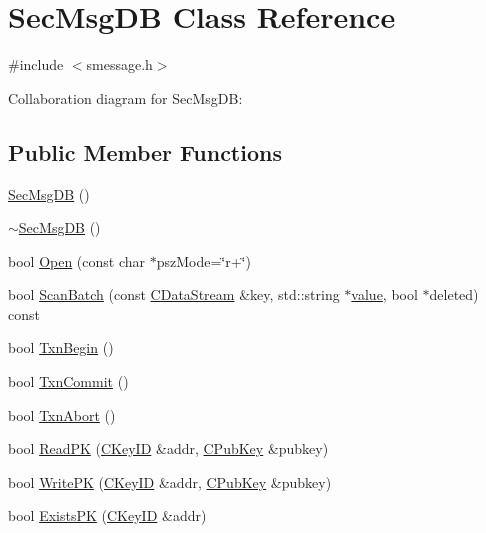 \hypertarget{class_sec_msg_d_b}{}\section{Sec\+Msg\+D\+B Class Reference}
\label{class_sec_msg_d_b}


{\ttfamily \#include $<$smessage.\+h$>$}



Collaboration diagram for Sec\+Msg\+D\+B\+:
\subsection*{Public Member Functions}
\begin{DoxyCompactItemize}
\item 
\hyperlink{class_sec_msg_d_b_a903159afeb64ca142f9f2634929e57fd}{Sec\+Msg\+D\+B} ()
\item 
\hyperlink{class_sec_msg_d_b_ac73f225e8632a99aeb3fb618935b0599}{$\sim$\+Sec\+Msg\+D\+B} ()
\item 
bool \hyperlink{class_sec_msg_d_b_a1fc6ac45b72e4df75be07fdadfc356ce}{Open} (const char $\ast$psz\+Mode=\char`\"{}r+\char`\"{})
\item 
bool \hyperlink{class_sec_msg_d_b_af26665a96e391711f4df702861d1557a}{Scan\+Batch} (const \hyperlink{class_c_data_stream}{C\+Data\+Stream} \&key, std\+::string $\ast$\hyperlink{cache_8cc_a0f61d63b009d0880a89c843bd50d8d76}{value}, bool $\ast$deleted) const 
\item 
bool \hyperlink{class_sec_msg_d_b_a0bbc537adf50f87a8bfaa68664e41c41}{Txn\+Begin} ()
\item 
bool \hyperlink{class_sec_msg_d_b_accabf13445ca07b9d37f456a3db6fe2f}{Txn\+Commit} ()
\item 
bool \hyperlink{class_sec_msg_d_b_a49e50670db162f8c9e192b7b00f0a813}{Txn\+Abort} ()
\item 
bool \hyperlink{class_sec_msg_d_b_aabce57e714b562302cee71bcea5e340f}{Read\+P\+K} (\hyperlink{class_c_key_i_d}{C\+Key\+I\+D} \&addr, \hyperlink{class_c_pub_key}{C\+Pub\+Key} \&pubkey)
\item 
bool \hyperlink{class_sec_msg_d_b_a77131fcd232e503a57ab8569d3ab9fd8}{Write\+P\+K} (\hyperlink{class_c_key_i_d}{C\+Key\+I\+D} \&addr, \hyperlink{class_c_pub_key}{C\+Pub\+Key} \&pubkey)
\item 
bool \hyperlink{class_sec_msg_d_b_ad039b1d29fc0e82695d3bd30087765b9}{Exists\+P\+K} (\hyperlink{class_c_key_i_d}{C\+Key\+I\+D} \&addr)
\item 

\end{DoxyCompactItemize}
